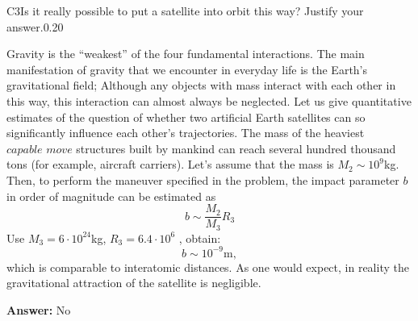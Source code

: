 \documentclass[11pt,a4paper]{article}
\begin{document}
\begin{solcard}{C3}{Is it really possible to put a satellite into orbit this way? Justify your answer.}{0.20}

Gravity is the “weakest” of the four fundamental interactions. The main manifestation of gravity that we encounter in everyday life is the Earth’s gravitational field; Although any objects with mass interact with each other in this way, this interaction can almost always be neglected. Let us give quantitative estimates of the question of whether two artificial Earth satellites can so significantly influence each other’s trajectories. The mass of the heaviest $\textit{capable move}$ structures built by mankind can reach several hundred thousand tons (for example, aircraft carriers). Let's assume that the mass is $M_2 \sim 10^9 $kg. Then, to perform the maneuver specified in the problem, the impact parameter $b$ in order of magnitude can be estimated as $$ b \sim \frac{M_2}{M_3} R_3 $$ Use $M_3 = 6 \cdot 10^{24} $kg, $R_3 = 6.4 \cdot 10^6$ , obtain: $$ b \sim 10^{-9} \text{m}, $$ which is comparable to interatomic distances. As one would expect, in reality the gravitational attraction of the satellite is negligible.

\par\smallskip\noindent\textbf{Answer:} No
\end{solcard}
\end{document}
